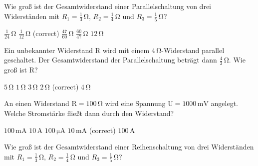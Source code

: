 \documentclass[11pt]{exam}
\begin{document}
\setlength{\voffset}{-0.5in}
\setlength{\headsep}{5pt}

\hspace{2mm}
 \hspace{5mm}
\vspace{4mm}

\begin{questions}

\question Wie groß ist der Gesamtwiderstand einer Parallelschaltung von drei Widerständen mit \(R_1=\mathrm{\frac{1}{3}\,\Omega}\), \(R_2=\mathrm{\frac{1}{4}\,\Omega}\) und \(R_3=\mathrm{\frac{1}{5}\,\Omega}\)?

\begin{choices}
	\choice \(\mathrm{\frac{1}{24}\,\Omega}\)
	\choice \(\mathrm{\frac{1}{12}\,\Omega}\) (correct)
	\choice \(\mathrm{\frac{47}{60}\,\Omega}\)
	\choice \(\mathrm{\frac{60}{47}\,\Omega}\)
	\choice \(\mathrm{12\,\Omega}\)
\end{choices}

\vspace{3mm}\question Ein unbekannter Widerstand \(\mathrm{R}\) wird mit einem \(\mathrm{4\,\Omega}\)-Widerstand parallel geschaltet. Der Gesamtwiderstand der Parallelschaltung beträgt dann \(\mathrm{\frac{4}{3}\,\Omega}\). Wie groß ist \(\mathrm{R}\)?

\begin{choices}
	\choice \(\mathrm{5\,\Omega}\)
	\choice \(\mathrm{1\,\Omega}\)
	\choice \(\mathrm{3\,\Omega}\)
	\choice \(\mathrm{2\,\Omega}\) (correct)
	\choice \(\mathrm{4\,\Omega}\)
\end{choices}

\vspace{3mm}\question An einen Widerstand \(\mathrm{R=100\,\Omega}\) wird eine Spannung \(\mathrm{U=1000\,mV}\) angelegt. Welche Stromstärke fließt dann durch den Widerstand?

\begin{choices}
	\choice \(\mathrm{100\,mA}\)
	\choice \(\mathrm{10\,A}\)
	\choice \(\mathrm{100\,\mu A}\)
	\choice \(\mathrm{10\,mA}\) (correct)
	\choice \(\mathrm{100\,A}\)
\end{choices}

\vspace{3mm}\question Wie groß ist der Gesamtwiderstand einer Reihenschaltung von drei Widerständen mit \(R_1=\mathrm{\frac{1}{3}\,\Omega}\), \(R_2=\mathrm{\frac{1}{4}\,\Omega}\) und \(R_3=\mathrm{\frac{1}{5}\,\Omega}\)?


\end{questions}
\end{document}
